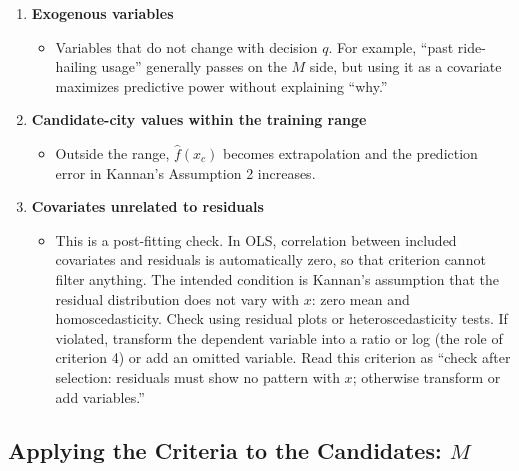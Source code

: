 \documentclass[10pt,a4paper]{article}
\begin{document}
\begin{mdframed}[linecolor=red,linewidth=0.6pt,innerleftmargin=8pt,innerrightmargin=8pt]
\begin{enumerate}
\begin{itemize}
\end{itemize}
\item \textbf{Exogenous variables}
\begin{itemize}
\item Variables that do not change with decision $q$. For example, ``past ride-hailing usage'' generally passes on the $M$ side, but using it as a covariate maximizes predictive power without explaining ``why.''
\end{itemize}
\item \textbf{Candidate-city values within the training range}
\begin{itemize}
\item Outside the range, $\hat f(x_c)$ becomes extrapolation and the prediction error in Kannan's Assumption 2 increases.
\end{itemize}
\item \textbf{Covariates unrelated to residuals}
\begin{itemize}
\item This is a post-fitting check. In OLS, correlation between included covariates and residuals is automatically zero, so that criterion cannot filter anything. The intended condition is Kannan's assumption that the residual distribution does not vary with $x$: zero mean and homoscedasticity. Check using residual plots or heteroscedasticity tests. If violated, transform the dependent variable into a ratio or log (the role of criterion 4) or add an omitted variable. Read this criterion as ``check after selection: residuals must show no pattern with $x$; otherwise transform or add variables.''
\end{itemize}
\end{enumerate}
\subsection{Applying the Criteria to the Candidates: $M$}

\end{mdframed}
\end{document}
